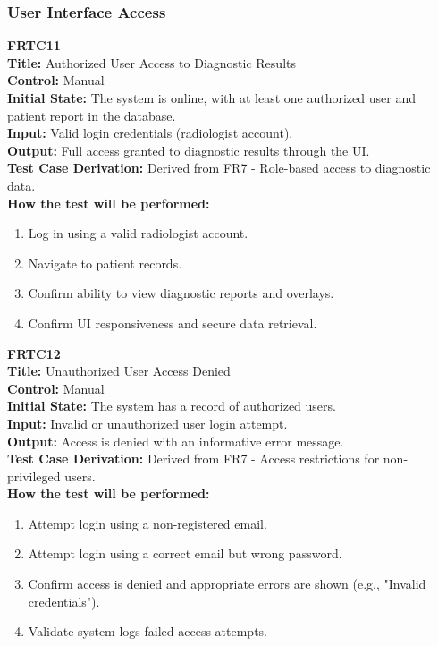 \documentclass[12pt, titlepage]{article}
\begin{document}
\vspace{1em}

\subsubsection{User Interface Access}

\textbf{FRTC11}\\
\textbf{Title:} Authorized User Access to Diagnostic Results\\
\textbf{Control:} Manual\\
\textbf{Initial State:} The system is online, with at least one authorized user and patient report in the database.\\
\textbf{Input:} Valid login credentials (radiologist account).\\
\textbf{Output:} Full access granted to diagnostic results through the UI.\\
\textbf{Test Case Derivation:} Derived from FR7 - Role-based access to diagnostic data.\\
\textbf{How the test will be performed:}
\begin{enumerate}
  \item Log in using a valid radiologist account.
  \item Navigate to patient records.
  \item Confirm ability to view diagnostic reports and overlays.
  \item Confirm UI responsiveness and secure data retrieval.
\end{enumerate}

\vspace{1em}

\textbf{FRTC12}\\
\textbf{Title:} Unauthorized User Access Denied\\
\textbf{Control:} Manual\\
\textbf{Initial State:} The system has a record of authorized users.\\
\textbf{Input:} Invalid or unauthorized user login attempt.\\
\textbf{Output:} Access is denied with an informative error message.\\
\textbf{Test Case Derivation:} Derived from FR7 - Access restrictions for non-privileged users.\\
\textbf{How the test will be performed:}
\begin{enumerate}
  \item Attempt login using a non-registered email.
  \item Attempt login using a correct email but wrong password.
  \item Confirm access is denied and appropriate errors are shown (e.g., "Invalid credentials").
  \item Validate system logs failed access attempts.
\end{enumerate}
\end{document}
